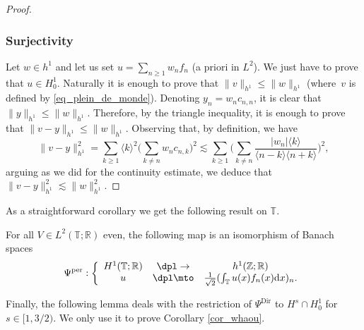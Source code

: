 \begin{proof}
\subsubsection*{Surjectivity}
Let $w\in h^1$ and let us set $u = \sum_{n\geq 1} w_n f_n$ (a priori in $L^2$). We just have to prove that $u \in H^1_0$. Naturally it is enough to prove that $\|v\|_{h^1} \leq \|w\|_{h^1}$ (where~$v$ is defined by \eqref{eq_plein_de_monde}). Denoting $y_n = w_n c_{n,n}$, it is clear that $\| y\|_{h^1} \leq \|w\|_{h^1}$. Therefore, by the triangle inequality, it is enough to prove that $\|v-y\|_{h^1} \leq \|w\|_{h^1}$. Observing that, by definition, we have
\[
\|v-y\|_{h^1}^2 = \sum_{k \geq 1} \langle k\rangle^2 \biggl(\sum_{k\neq n} w_n c_{n,k} \biggr)^2 \lesssim \sum_{k \geq 1} \biggl(\sum_{k\neq n} \frac{|w_n| \langle k \rangle}{\langle n-k \rangle \langle n+k \rangle } \biggr)^2,
\]
arguing as we did for the continuity estimate, we deduce that $\|v-y\|_{h^1}^2\lesssim \| w \|_{h^1}^2$.
\end{proof}
As a straightforward corollary we get the following result on $\mathbb{T}$.
\begin{corollary}
\label{cor_id_per}
For all $V\in L^2(\mathbb{T};\mathbb{R})$ even, the following map is an isomorphism of Banach spaces
\[
\Psi^{\mathrm{per}}:\left\{ \begin{array}{ccc} H^1(\mathbb{T};\mathbb{R}) & \dpl\to & h^1(\mathbb{Z};\mathbb{R}) \\
u & \dpl\mto & \frac1{\sqrt2} (\int_\mathbb{T} u(x) f_n(x) \mathrm{d}x)_n.
\end{array} \right.
\]
\end{corollary}

Finally, the following lemma deals with the restriction of $\Psi^{\mathrm{Dir}}$ to $H^{s}\cap H^1_0$ for $s\in[1,3/2)$. We only use it to prove Corollary \ref{cor_whaou}.


